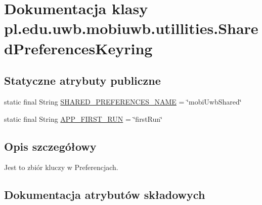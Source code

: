 \hypertarget{classpl_1_1edu_1_1uwb_1_1mobiuwb_1_1utillities_1_1_shared_preferences_keyring}{}\section{Dokumentacja klasy pl.\+edu.\+uwb.\+mobiuwb.\+utillities.\+Shared\+Preferences\+Keyring}
\label{classpl_1_1edu_1_1uwb_1_1mobiuwb_1_1utillities_1_1_shared_preferences_keyring}
\subsection*{Statyczne atrybuty publiczne}
\begin{DoxyCompactItemize}
\item 
static final String \hyperlink{classpl_1_1edu_1_1uwb_1_1mobiuwb_1_1utillities_1_1_shared_preferences_keyring_a23d1c96090a7a001251efce7542ce097}{S\+H\+A\+R\+E\+D\+\_\+\+P\+R\+E\+F\+E\+R\+E\+N\+C\+E\+S\+\_\+\+N\+A\+M\+E} = \char`\"{}mobi\+Uwb\+Shared\char`\"{}
\item 
static final String \hyperlink{classpl_1_1edu_1_1uwb_1_1mobiuwb_1_1utillities_1_1_shared_preferences_keyring_a183df76a7463b90cee1b06b40777dd32}{A\+P\+P\+\_\+\+F\+I\+R\+S\+T\+\_\+\+R\+U\+N} = \char`\"{}first\+Run\char`\"{}
\end{DoxyCompactItemize}


\subsection{Opis szczegółowy}
Jest to zbiór kluczy w Preferencjach. 

\subsection{Dokumentacja atrybutów składowych}
\hypertarget{classpl_1_1edu_1_1uwb_1_1mobiuwb_1_1utillities_1_1_shared_preferences_keyring_a183df76a7463b90cee1b06b40777dd32}{}
